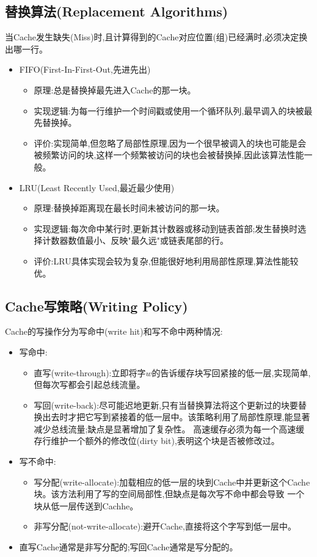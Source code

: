 \subsection{替换算法(Replacement Algorithms)}
当Cache发生缺失(Miss)时,且计算得到的Cache对应位置(组)已经满时,必须决定换出哪一行。
\begin{itemize}
    \item FIFO(First-In-First-Out,先进先出)
    \begin{itemize}
        \item 原理:总是替换掉最先进入Cache的那一块。
        \item 实现逻辑:为每一行维护一个时间戳或使用一个循环队列,最早调入的块被最先替换掉。
        \item 评价:实现简单,但忽略了局部性原理,因为一个很早被调入的块也可能是会被频繁访问的块,这样一个频繁被访问的块也会被替换掉,因此该算法性能一般。 
    \end{itemize}
    \item LRU(Least Recently Used,最近最少使用)
    \begin{itemize}
        \item 原理:替换掉距离现在最长时间未被访问的那一块。
        \item 实现逻辑:每次命中某行时,更新其计数器或移动到链表首部;发生替换时选择计数器数值最小、反映"最久远"或链表尾部的行。
        \item 评价:LRU具体实现会较为复杂,但能很好地利用局部性原理,算法性能较优。
    \end{itemize}
\end{itemize}

\subsection{Cache写策略(Writing Policy)}
Cache的写操作分为写命中(write hit)和写不命中两种情况:
\begin{itemize}
    \item 写命中:
    \begin{itemize}
        \item 直写(write-through):立即将字$w$的告诉缓存块写回紧接的低一层,实现简单,但每次写都会引起总线流量。
        \item 写回(write-back):尽可能迟地更新,只有当替换算法将这个更新过的块要替换出去时才把它写到紧接着的低一层中。该策略利用了局部性原理,能显著减少总线流量;缺点是显著增加了复杂性。
高速缓存必须为每一个高速缓存行维护一个额外的修改位(dirty bit),表明这个块是否被修改过。
    \end{itemize}
    \item 写不命中:
    \begin{itemize}
        \item 写分配(write-allocate):加载相应的低一层的块到Cache中并更新这个Cache块。该方法利用了写的空间局部性,但缺点是每次写不命中都会导致
一个块从低一层传送到Cachhe。
        \item 非写分配(not-write-allocate):避开Cache,直接将这个字写到低一层中。
    \end{itemize}
    \item 直写Cache通常是非写分配的;写回Cache通常是写分配的。

\end{itemize}

